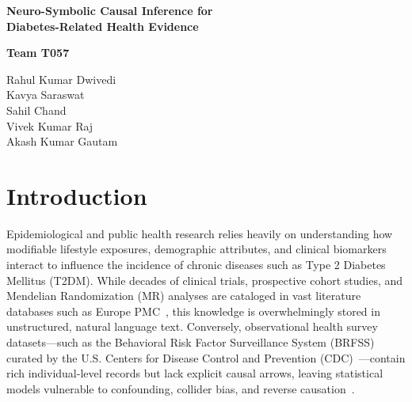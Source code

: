 \documentclass[11pt,a4paper]{article}
\begin{document}
\begin{titlepage}
    \centering

    \vspace*{2.5cm}

    {\LARGE \bfseries
    Neuro-Symbolic Causal Inference for\\[0.3cm]
    Diabetes-Related Health Evidence
    \par}
    
    \vspace{7.5cm}

    {\Large \bfseries Team T057\par}

    \vspace{0.8cm}

    {\large
    Rahul Kumar Dwivedi \\[0.4cm]
    Kavya Saraswat \\[0.4cm]
    Sahil Chand \\[0.4cm]
    Vivek Kumar Raj \\[0.4cm]
    Akash Kumar Gautam 
    \par}

    \vfill

\end{titlepage}

\newpage
\tableofcontents
\newpage

\section{Introduction}
\label{sec:introduction}

Epidemiological and public health research relies heavily on understanding how modifiable lifestyle exposures, demographic attributes, and clinical biomarkers interact to influence the incidence of chronic diseases such as Type 2 Diabetes Mellitus (T2DM). While decades of clinical trials, prospective cohort studies, and Mendelian Randomization (MR) analyses are cataloged in vast literature databases such as Europe PMC~\cite{europepmc2025}, this knowledge is overwhelmingly stored in unstructured, natural language text. Conversely, observational health survey datasets—such as the Behavioral Risk Factor Surveillance System (BRFSS) curated by the U.S. Centers for Disease Control and Prevention (CDC)~\cite{cdc2022brfss}—contain rich individual-level records but lack explicit causal arrows, leaving statistical models vulnerable to confounding, collider bias, and reverse causation~\cite{pearl2009causality}.
\end{document}
